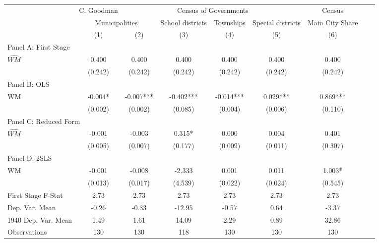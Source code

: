  \begin{tabular}{l*{8}{c}} \toprule
&\multicolumn{1}{c}{C. Goodman}&\multicolumn{4}{c}{Census of Governments}&\multicolumn{1}{c}{Census}\\\cmidrule(lr){2-2}\cmidrule(lr){3-6}\cmidrule(lr){7-7}
&\multicolumn{2}{c}{Municipalities}&\multicolumn{1}{c}{School districts}&\multicolumn{1}{c}{Townships}&\multicolumn{1}{c}{Special districts}&\multicolumn{1}{c}{Main City Share}\\\cmidrule(lr){2-3}\cmidrule(lr){4-6}\cmidrule(lr){7-7}
&\multicolumn{1}{c}{(1)}&\multicolumn{1}{c}{(2)}&\multicolumn{1}{c}{(3)}&\multicolumn{1}{c}{(4)}&\multicolumn{1}{c}{(5)}&\multicolumn{1}{c}{(6)}\\
\cmidrule(lr){1-7}
\multicolumn{6}{l}{Panel A: First Stage}\\
\cmidrule(lr){1-7}
$\widehat{WM}$  &    0.400   &    0.400   &    0.400   &    0.400   &    0.400   &    0.400   \\
                &  (0.242)   &  (0.242)   &  (0.242)   &  (0.242)   &  (0.242)   &  (0.242)   \\
\cmidrule(lr){1-7}
\multicolumn{6}{l}{Panel B: OLS}\\
\cmidrule(lr){1-7}
WM              &   -0.004*  &   -0.007***&   -0.402***&   -0.014***&    0.029***&    0.869***\\
                &  (0.002)   &  (0.002)   &  (0.085)   &  (0.004)   &  (0.006)   &  (0.110)   \\
\cmidrule(lr){1-7}
\multicolumn{6}{l}{Panel C: Reduced Form}\\
\cmidrule(lr){1-7}
$\widehat{WM}$  &   -0.001   &   -0.003   &    0.315*  &    0.000   &    0.004   &    0.401   \\
                &  (0.005)   &  (0.007)   &  (0.177)   &  (0.009)   &  (0.011)   &  (0.307)   \\
\cmidrule(lr){1-7}
\multicolumn{6}{l}{Panel D: 2SLS}\\
\cmidrule(lr){1-7}
WM              &   -0.001   &   -0.008   &   -2.333   &    0.001   &    0.011   &    1.003*  \\
                &  (0.013)   &  (0.017)   &  (4.539)   &  (0.022)   &  (0.024)   &  (0.545)   \\
\midrule
First Stage F-Stat&     2.73   &     2.73   &     2.73   &     2.73   &     2.73   &     2.73   \\
Dep. Var. Mean  &    -0.26   &    -0.33   &   -12.95   &    -0.57   &     0.64   &    -3.37   \\
1940 Dep. Var. Mean&     1.49   &     1.61   &    14.09   &     2.29   &     0.89   &    32.86   \\
Observations    &      130   &      130   &      118   &      130   &      130   &      130   \\
 \bottomrule \end{tabular}
